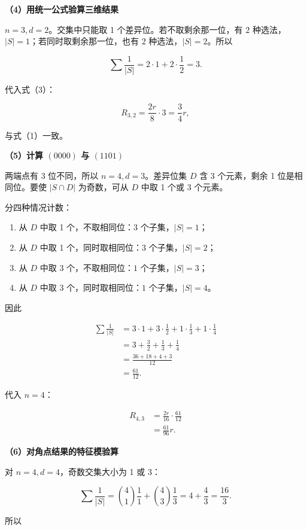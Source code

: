 \documentclass[12pt,a4paper,UTF8]{ctexart}
\newcommand{\tightlist}{\setlength{\itemsep}{0pt}\setlength{\parskip}{0pt}}
\begin{document}
\textbf{（4）用统一公式验算三维结果}

\(n=3,d=2\)。交集中只能取 1 个差异位。若不取剩余那一位，有 \(2\)
种选法，\(|S|=1\)；若同时取剩余那一位，也有 \(2\)
种选法，\(|S|=2\)。所以

\[
\sum\frac1{|S|}
=2\cdot1+2\cdot\frac12=3.
\]

代入式（3）：

\[
R_{3,2}=\frac{2r}{8}\cdot3=\frac34r,
\]

与式（1）一致。

\textbf{（5）计算 \((0000)\) 与 \((1101)\)}

两端点有 3 位不同，所以 \(n=4,d=3\)。差异位集 \(D\) 含 3 个元素，剩余 1
位是相同位。要使 \(|S\cap D|\) 为奇数，可从 \(D\) 中取 1 个或 3 个元素。

分四种情况计数：

\begin{enumerate}
\def\labelenumi{\arabic{enumi}.}
\tightlist
\item
  从 \(D\) 中取 1 个，不取相同位：\(3\) 个子集，\(|S|=1\)；
\item
  从 \(D\) 中取 1 个，同时取相同位：\(3\) 个子集，\(|S|=2\)；
\item
  从 \(D\) 中取 3 个，不取相同位：\(1\) 个子集，\(|S|=3\)；
\item
  从 \(D\) 中取 3 个，同时取相同位：\(1\) 个子集，\(|S|=4\)。
\end{enumerate}

因此

\[
\begin{aligned}
\sum\frac1{|S|}
&=3\cdot1+3\cdot\frac12+1\cdot\frac13+1\cdot\frac14\\
&=3+\frac32+\frac13+\frac14\\
&=\frac{36+18+4+3}{12}\\
&=\frac{61}{12}.
\end{aligned}
\]

代入 \(n=4\)：

\[
\begin{aligned}
R_{4,3}
&=\frac{2r}{16}\cdot\frac{61}{12}\\
&=\boxed{\frac{61}{96}r}.
\end{aligned}\tag{4}
\]

\textbf{（6）对角点结果的特征模验算}

对 \(n=4,d=4\)，奇数交集大小为 1 或 3：

\[
\sum\frac1{|S|}
=\binom41\frac11+\binom43\frac13
=4+\frac43
=\frac{16}{3}.
\]

所以
\end{document}

